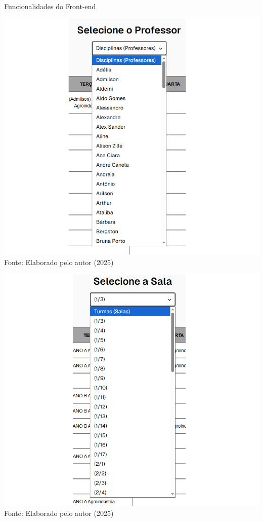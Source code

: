 \begin{frame}{Funcionalidades do Front-end}
    \begin{minipage}{0.48\textwidth}
        \centering
        \includegraphics[width=1\textwidth]{figuras/front-18.png}
        \footnotesize Fonte: Elaborado pelo autor (2025)
    \end{minipage}
    \hfill
    \begin{minipage}{0.48\textwidth}
        \centering
        \includegraphics[width=1\textwidth]{figuras/front-19.png}
        \footnotesize Fonte: Elaborado pelo autor (2025)
    \end{minipage}
\end{frame}

